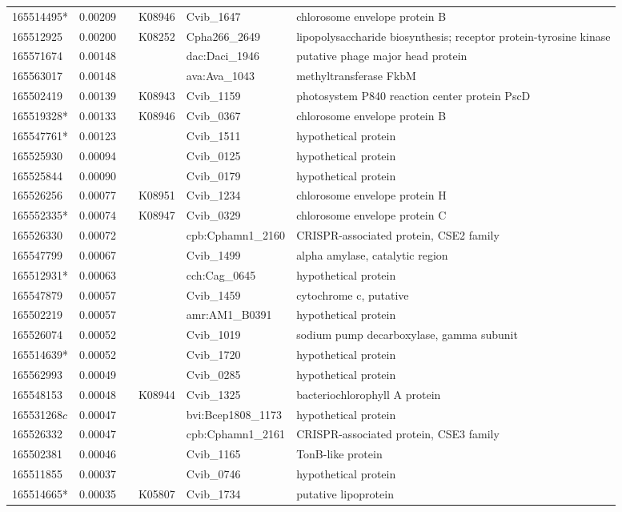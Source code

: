 \begin{landscape}
\begin{longtable}{p{1.6cm}p{1.2cm}p{1.5cm}p{1.5cm}p{2.8cm}p{13.5cm}}
165514495*&0.00209&&K08946&Cvib\_1647&chlorosome envelope protein B \\
165512925&0.00200&&K08252&Cpha266\_2649&lipopolysaccharide biosynthesis; receptor protein-tyrosine kinase \\
165571674&0.00148&&&dac:Daci\_1946&putative phage major head protein \\
165563017&0.00148&&&ava:Ava\_1043&methyltransferase FkbM \\
165502419&0.00139&&K08943&Cvib\_1159&photosystem P840 reaction center protein PscD \\
165519328*&0.00133&&K08946&Cvib\_0367&chlorosome envelope protein B \\
165547761*&0.00123&&&Cvib\_1511&hypothetical protein \\
165525930&0.00094&&&Cvib\_0125&hypothetical protein \\
165525844&0.00090&&&Cvib\_0179&hypothetical protein \\
165526256&0.00077&&K08951&Cvib\_1234&chlorosome envelope protein H \\
165552335*&0.00074&&K08947&Cvib\_0329&chlorosome envelope protein C \\
165526330&0.00072&&&cpb:Cphamn1\_2160&CRISPR-associated protein, CSE2 family \\
165547799&0.00067&&&Cvib\_1499&alpha amylase, catalytic region \\
165512931*&0.00063&&&cch:Cag\_0645&hypothetical protein \\
165547879&0.00057&&&Cvib\_1459&cytochrome c, putative \\
165502219&0.00057&&&amr:AM1\_B0391&hypothetical protein \\
165526074&0.00052&&&Cvib\_1019&sodium pump decarboxylase, gamma subunit \\
165514639*&0.00052&&&Cvib\_1720&hypothetical protein \\
165562993&0.00049&&&Cvib\_0285&hypothetical protein \\
165548153&0.00048&&K08944&Cvib\_1325&bacteriochlorophyll A protein \\
165531268$c$&0.00047&&&bvi:Bcep1808\_1173&hypothetical protein \\
165526332&0.00047&&&cpb:Cphamn1\_2161&CRISPR-associated protein, CSE3 family \\
165502381&0.00046&&&Cvib\_1165&TonB-like protein \\
165511855&0.00037&&&Cvib\_0746&hypothetical protein \\
165514665*&0.00035&&K05807&Cvib\_1734&putative lipoprotein \\

\end{longtable}
\end{landscape}
